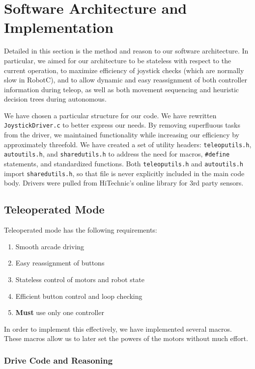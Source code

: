 \documentclass{article}
\begin{document}
\section{Software Architecture and Implementation}
Detailed in this section is the method and reason to our software architecture. In particular, we aimed for our architecture to be stateless with respect to the current operation, to maximize efficiency of joystick checks (which are normally slow in RobotC), and to allow dynamic and easy reassignment of both controller information during teleop, as well as both movement sequencing and heuristic decision trees during autonomous.

We have chosen a particular structure for our code. We have rewritten \lstinline{JoystickDriver.c}{} to better express our needs. By removing superfluous tasks from the driver, we maintained functionality while increasing our efficiency by approximately threefold. We have created a set of utility headers: \lstinline{teleoputils.h}{}, \lstinline{autoutils.h}{}, and \lstinline{sharedutils.h}{} to address the need for macros, \lstinline{#define}{} statements, and standardized functions. Both \lstinline{teleoputils.h}{} and \lstinline{autoutils.h}{} import \lstinline{sharedutils.h}{}, so that file is never explicitly included in the main code body. Drivers were pulled from HiTechnic's online library for 3rd party sensors.

\subsection{Teleoperated Mode}

Teleoperated mode has the following requirements: \begin{enumerate}
	\item{Smooth arcade driving}
	\item{Easy reassignment of buttons}
	\item{Stateless control of motors and robot state}
	\item{Efficient button control and loop checking}
	\item{\textbf{Must} use only one controller}
\end{enumerate}

In order to implement this effectively, we have implemented several macros. These macros allow us to later set the powers of the motors without much effort. 

\subsubsection{Drive Code and Reasoning}
\end{document}
